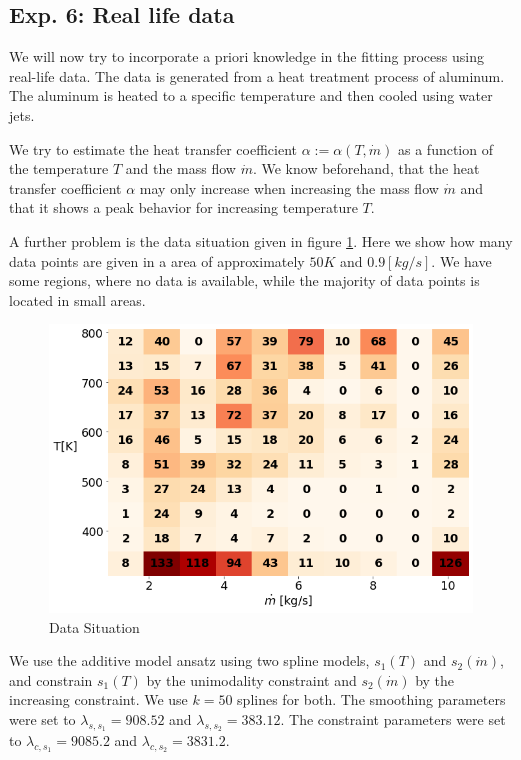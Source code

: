 \documentclass[10pt,a4paper]{article}
\begin{document}
\subsection{Exp. 6: Real life data} \label{subsec:real-life-data}

We will now try to incorporate a priori knowledge in the fitting process using real-life data. The data is generated from a heat treatment process of aluminum. The aluminum is heated to a specific temperature and then cooled using water jets.

We try to estimate the heat transfer coefficient $\alpha := \alpha(T, \dot m)$ as a function of the temperature $T$ and the mass flow $\dot m$. We know beforehand, that the heat transfer coefficient $\alpha$ may only increase when increasing the mass flow $\dot m$ and that it shows a peak behavior for increasing temperature $T$. 

A further problem is the data situation given in figure \ref{fig:ebner_data_situation}. Here we show how many data points are given in a area of approximately $50 K$ and $0.9 [kg/s]$. We have some regions, where no data is available, while the majority of data points is located in small areas.


\begin{figure}[H]
	\centering
	\includegraphics[width=\columnwidth]{../thesisplots/ebner/data_distribution.png}
	\caption{Data Situation}
	\label{fig:ebner_data_situation}
\end{figure}

We use the additive model ansatz using two spline models, $s_1(T)$ and $s_2(\dot m)$, and constrain $s_1(T)$ by the unimodality constraint and $s_2(\dot m)$ by the increasing constraint. We use $k=50$ splines for both. The smoothing parameters were set to $\lambda_{s, s_1} = 908.52$ and $\lambda_{s, s_2} = 383.12$. The constraint parameters were set to $\lambda_{c, s_1} = 9085.2$ and $\lambda_{c, s_2} = 3831.2$. 
\end{document}
